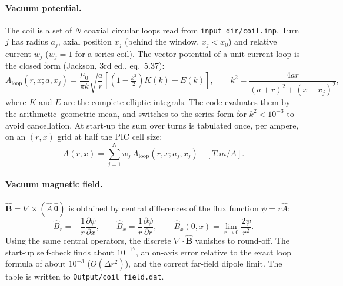 \documentclass[11pt,a4paper]{article}
\newcommand{\Ahat}{\hat{A}}
\newcommand{\code}[1]{\texttt{#1}}
\begin{document}
\paragraph{Vacuum potential.} The coil is a set of $N$ coaxial circular loops
read from \code{input\_dir/coil.inp}. Turn $j$ has radius $a_j$, axial
position $x_j$ (behind the window, $x_j < x_0$) and relative current $w_j$
($w_j = 1$ for a series coil). The vector potential of a unit-current loop
is the closed form (Jackson, 3rd ed., eq.~5.37):
\begin{equation}
  A_{\mathrm{loop}}(r,x;a,x_j) = \frac{\mu_0}{\pi k}\sqrt{\frac{a}{r}}
  \left[\left(1-\tfrac{k^2}{2}\right)K(k) - E(k)\right], \qquad
  k^2 = \frac{4ar}{(a+r)^2 + (x-x_j)^2},
\end{equation}
where $K$ and $E$ are the complete elliptic integrals. The code evaluates
them by the arithmetic--geometric mean, and switches to the series form for
$k^2 < 10^{-3}$ to avoid cancellation. At start-up the sum over turns is
tabulated once, per ampere, on an $(r,x)$ grid at half the PIC cell size:
\begin{equation}
  \Ahat(r,x) = \sum_{j=1}^{N} w_j\, A_{\mathrm{loop}}(r,x;a_j,x_j)
  \quad [\si{T.m/A}] .
\end{equation}

\paragraph{Vacuum magnetic field.} $\hat{\mathbf{B}} =
\nabla\times(\Ahat\,\hat{\boldsymbol\theta})$ is obtained by central
differences of the flux function $\psi = r\Ahat$:
\begin{equation}
  \hat B_r = -\frac{1}{r}\frac{\partial\psi}{\partial x}, \qquad
  \hat B_x = \frac{1}{r}\frac{\partial\psi}{\partial r}, \qquad
  \hat B_x(0,x) = \lim_{r\to 0}\frac{2\psi}{r^2}.
\end{equation}
Using the same central operators, the discrete $\nabla\cdot\hat{\mathbf B}$
vanishes to round-off. The start-up self-check finds about $10^{-17}$, an
on-axis error relative to the exact loop formula of about $10^{-3}$
($O(\Delta r^2)$), and the correct far-field dipole limit. The table is
written to \code{Output/coil\_field.dat}.
\end{document}

